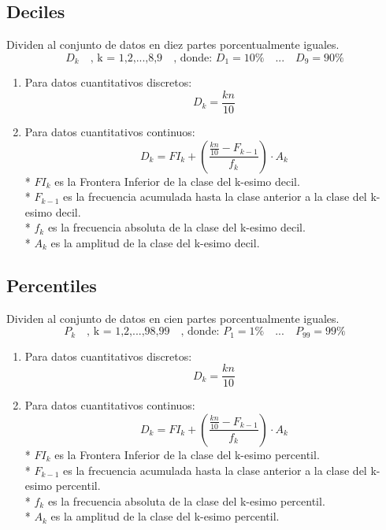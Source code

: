 \documentclass{templateNote}
\begin{document}
\subsection{Deciles}
Dividen al conjunto de datos en diez partes porcentualmente iguales.
\[
    D_k \quad \text{, k = 1,2,...,8,9} \quad
    \text{, donde: } D_1 = 10\% \quad ...\quad D_9 = 90\%
\]
\begin{enumerate}
    \item Para datos cuantitativos discretos:
    \begin{equation*}
        D_k = \frac{kn}{10}
    \end{equation*}
    \item Para datos cuantitativos continuos:
    \begin{equation*}
        D_k = FI_k + \left(\frac{\displaystyle \frac{kn}{10} - F_{k-1}}{f_k}\right) \cdot A_k
    \end{equation*}
    * $FI_k$ es la Frontera Inferior de la clase del k-esimo decil.\\
    * $F_{k-1}$ es la frecuencia acumulada hasta la clase anterior a la clase del k-esimo decil. \\
    * $f_k$ es la frecuencia absoluta de la clase del k-esimo decil.\\
    * $A_k$ es la amplitud de la clase del k-esimo decil.\\
\end{enumerate}

\subsection{Percentiles}
Dividen al conjunto de datos en cien partes porcentualmente iguales.
\[
    P_k \quad \text{, k = 1,2,...,98,99} \quad
    \text{, donde: } P_1 = 1\% \quad ...\quad P_{99} = 99\%
\]
\begin{enumerate}
    \item Para datos cuantitativos discretos:
    \begin{equation*}
        D_k = \frac{kn}{10}
    \end{equation*}
    \item Para datos cuantitativos continuos:
    \begin{equation*}
        D_k = FI_k + \left(\frac{\displaystyle \frac{kn}{10} - F_{k-1}}{f_k}\right) \cdot A_k
    \end{equation*}
    * $FI_k$ es la Frontera Inferior de la clase del k-esimo percentil.\\
    * $F_{k-1}$ es la frecuencia acumulada hasta la clase anterior a la clase del k-esimo percentil. \\
    * $f_k$ es la frecuencia absoluta de la clase del k-esimo percentil.\\
    * $A_k$ es la amplitud de la clase del k-esimo percentil.\\
\end{enumerate}
\end{document}

